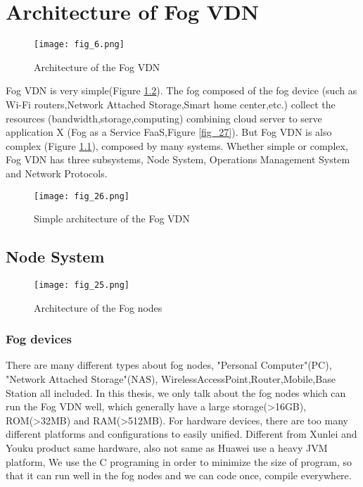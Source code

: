 \chapter{Architecture of Fog VDN}
\label{chap:chap-three}
\begin{figure}[htbp]
\centering
	  \texttt{[image: fig\_6.png]}
    \caption{Architecture of the Fog VDN}
	  \vskip 1.0cm
 \label{fig_6}
\end{figure}



Fog VDN is very simple(Figure \ref{fig_26}). The fog composed of the fog device
(such as Wi-Fi routers,Network Attached Storage,Smart home center,etc.) collect the
resources (bandwidth,storage,computing) combining cloud server to serve application X
(Fog as a Service FaaS,Figure \ref{fig_27}). But Fog VDN is also complex (Figure \ref{fig_6}),
composed by many systems. Whether simple or complex, Fog VDN has three subsystems,
Node System, Operations Management System and Network Protocols.

\begin{figure}[htbp]
\centering
	  \texttt{[image: fig\_26.png]}
    \caption{Simple architecture of the Fog VDN}
 \label{fig_26}
\end{figure}

\section{Node System}
 \label{Node System}
\begin{figure}[htbp]
\centering
	  \texttt{[image: fig\_25.png]}
    \caption{ Architecture of the Fog nodes}
 \label{fig_25}
\end{figure}

  \subsection{Fog devices}
    \label{Fog devices}
  There are many different types about fog nodes, "Personal Computer"(PC), "Network Attached Storage"(NAS),
WirelessAccessPoint,Router,Mobile,Base Station all included. In this thesis, we only talk about the fog nodes
which can run the Fog VDN well, which generally have a large storage(>16GB), ROM(>32MB) and RAM(>512MB).
  For hardware devices, there are too many different platforms and configurations to easily unified.
Different from Xunlei and Youku product same hardware, also not same as Huawei use a heavy JVM platform,
 We use the C programing in order to minimize the size of program, so that it can run well in the fog
nodes and we can code once, compile everywhere.
